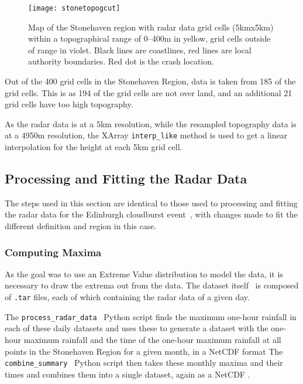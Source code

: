 \begin{figure}[H]
    \begin{center}
        \texttt{[image: stonetopogcut]}
    \end{center}
    \caption[Map of the Stonehaven region with radar data grid cells within a range of 0--400m.]{
        Map of the Stonehaven region with radar data grid cells (5kmx5km) within a topographical range of 0--400m in yellow,
    grid cells outside of range in violet.
    Black lines are coastlines, red lines are local authority boundaries.
    Red dot is the crash location.}
    \label{fig:stonetopogallowed}
\end{figure}

Out of the 400 grid cells in the Stonehaven Region,
    data is taken from 185 of the grid cells.
This is as 194 of the grid cells are not over land,
    and an additional 21 grid cells have too high topography.

As the radar data is at a 5km resolution,
    while the resampled topography data is at a 4950m resolution,
    the XArray \texttt{interp\_like} method is used to get a linear interpolation for the height at each 5km grid cell.

\subsection{Processing and Fitting the Radar Data}\label{subsec:radarprocess}

The steps used in this section are identical to those used to processing and fitting the radar data for the Edinburgh cloudburst event~\cite{Tett_Soon},
    with changes made to fit the different definition and region in this case.

\subsubsection{Computing Maxima}

As the goal was to use an Extreme Value distribution to model the data,
    it is necessary to draw the extrema out from the data.
The dataset itself~\cite{radar_data} is composed of \texttt{.tar} files, each of which containing the radar data of a given day.

The \texttt{process\_radar\_data}~\cite{Me_Code} Python script finds the maximum one-hour rainfall in each of these daily datasets and
    uses these to generate a dataset with the one-hour maximum rainfall and the time of the one-hour maximum rainfall
    at all points in the Stonehaven Region for a given month, in a NetCDF format
The \texttt{combine\_summary}~\cite{Me_Code} Python script then takes these monthly maxima and their times and combines them into a single dataset,
    again as a NetCDF .

